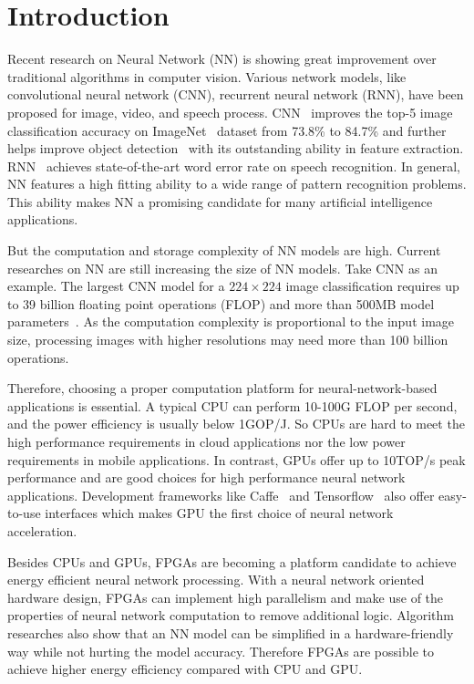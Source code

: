 \section{Introduction}\label{sec:introduction}

Recent research on Neural Network (NN) is showing great improvement over traditional algorithms in computer vision. Various network models, like convolutional neural network (CNN), recurrent neural network (RNN), have been proposed for image, video, and speech process. CNN~\cite{krizhevsky2012imagenet} improves the top-5 image classification accuracy on ImageNet~\cite{ILSVRC15} dataset from 73.8\% to 84.7\% and further helps improve object detection~\cite{girshick2014rich} with its outstanding ability in feature extraction. RNN~\cite{hannun2014deep} achieves state-of-the-art word error rate on speech recognition. In general, NN features a high fitting ability to a wide range of pattern recognition problems. This ability makes NN a promising candidate for many artificial intelligence applications.

But the computation and storage complexity of NN models are high. Current researches on NN are still increasing the size of NN models. Take CNN as an example. The largest CNN model for a $224\times224$ image classification requires up to 39 billion floating point operations (FLOP) and more than 500MB model parameters~\cite{simonyan2014very}. As the computation complexity is proportional to the input image size, processing images with higher resolutions may need more than 100 billion operations.

Therefore, choosing a proper computation platform for neural-network-based applications is essential. A typical CPU can perform 10-100G FLOP per second, and the power efficiency is usually below 1GOP/J. So CPUs are hard to meet the high performance requirements in cloud applications nor the low power requirements in mobile applications. In contrast, GPUs offer up to 10TOP/s peak performance and are good choices for high performance neural network applications. Development frameworks like Caffe~\cite{jia2014caffe} and Tensorflow~\cite{abadi2016tensorflow} also offer easy-to-use interfaces which makes GPU the first choice of neural network acceleration. 

Besides CPUs and GPUs, FPGAs are becoming a platform candidate to achieve energy efficient neural network processing. With a neural network oriented hardware design, FPGAs can implement high parallelism and make use of the properties of neural network computation to remove additional logic. Algorithm researches also show that an NN model can be simplified in a hardware-friendly way while not hurting the model accuracy. Therefore FPGAs are possible to achieve higher energy efficiency compared with CPU and GPU. 

